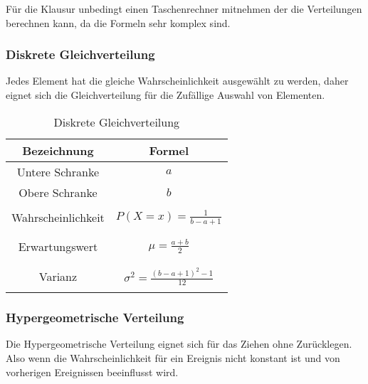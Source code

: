 \documentclass[12pt]{scrartcl}
\begin{document}
Für die Klausur unbedingt einen Taschenrechner mitnehmen der die Verteilungen berechnen kann,
da die Formeln sehr komplex sind.

\subsubsection{Diskrete Gleichverteilung}

Jedes Element hat die gleiche Wahrscheinlichkeit ausgewählt zu werden,
daher eignet sich die Gleichverteilung für die Zufällige Auswahl von Elementen.

\begin{table}[h]
    \begin{tabular}{ | c | c | }
        \hline
        Bezeichnung        & Formel                              \\
        \hline
        Untere Schranke    & $a$                                 \\
        Obere Schranke     & $b$                                 \\
        \hline             &                                     \\
        Wahrscheinlichkeit & $P(X=x) = \frac{1}{b-a+1}$          \\&\\&\\
        Erwartungswert     & $\mu = \frac{a+b}{2}$               \\&\\&\\
        Varianz            & $\sigma^2 = \frac{(b-a+1)^2-1}{12}$ \\&\\
        \hline
    \end{tabular}
    \caption{Diskrete Gleichverteilung}
\end{table}

\pagebreak

\subsubsection{Hypergeometrische Verteilung}

Die Hypergeometrische Verteilung eignet sich für das Ziehen ohne Zurücklegen.
Also wenn die Wahrscheinlichkeit für ein Ereignis nicht konstant ist und von vorherigen Ereignissen beeinflusst wird.
\end{document}
